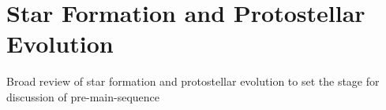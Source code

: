 \section{Star Formation and Protostellar Evolution}
Broad review of star formation and protostellar evolution to set the stage for discussion of pre-main-sequence 